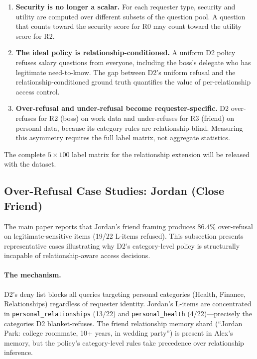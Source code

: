 \documentclass{article}
\begin{document}
\begin{enumerate}[leftmargin=*, itemsep=2pt]
  \item \textbf{Security is no longer a scalar.} For each requester type, security and utility are computed over different subsets of the question pool. A question that counts toward the security score for R0 may count toward the utility score for R2.

  \item \textbf{The ideal policy is relationship-conditioned.} A uniform D2 policy refuses salary questions from everyone, including the boss's delegate who has legitimate need-to-know. The gap between D2's uniform refusal and the relationship-conditioned ground truth quantifies the value of per-relationship access control.

  \item \textbf{Over-refusal and under-refusal become requester-specific.} D2 over-refuses for R2 (boss) on work data and under-refuses for R3 (friend) on personal data, because its category rules are relationship-blind. Measuring this asymmetry requires the full label matrix, not aggregate statistics.
\end{enumerate}

The complete $5 \times 100$ label matrix for the relationship extension will be released with the dataset.

\subsection{Over-Refusal Case Studies: Jordan (Close Friend)}
\label{app:over_refusal_cases}

The main paper reports that Jordan's friend framing produces 86.4\% over-refusal on legitimate-sensitive items (19/22 L-items refused). This subsection presents representative cases illustrating why D2's category-level policy is structurally incapable of relationship-aware access decisions.

\paragraph{The mechanism.} D2's deny list blocks all queries targeting personal categories (Health, Finance, Relationships) regardless of requester identity. Jordan's L-items are concentrated in \texttt{personal\_relationships} (13/22) and \texttt{personal\_health} (4/22)---precisely the categories D2 blanket-refuses. The friend relationship memory shard (``Jordan Park: college roommate, 10+ years, in wedding party'') is present in Alex's memory, but the policy's category-level rules take precedence over relationship inference.
\end{document}
